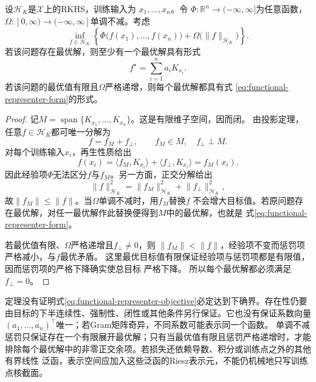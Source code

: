 \begin{theorem}[有限样本表示定理]
\label{thm:functional-representer-theorem}
设$\mathcal{H}_K$是$\mathcal{X}$上的RKHS，训练输入为
$x_1,\ldots,x_n$。令
$\Phi:\mathbb{R}^n\to(-\infty,\infty]$为任意函数，
$\Omega:[0,\infty)\to(-\infty,\infty]$单调不减。考虑
\begin{equation}
  \inf_{f\in\mathcal{H}_K}
  \left\{
    \Phi\bigl(f(x_1),\ldots,f(x_n)\bigr)
    +
    \Omega\bigl(\lVert f\rVert_{\mathcal{H}_K}\bigr)
  \right\}.
  \label{eq:functional-representer-objective}
\end{equation}
若该问题存在最优解，则至少有一个最优解具有形式
\begin{equation}
  f^\star
  =
  \sum_{i=1}^{n}a_iK_{x_i}.
  \label{eq:functional-representer-form}
\end{equation}
若该问题的最优值有限且$\Omega$严格递增，则每个最优解都具有式
\eqref{eq:functional-representer-form}的形式。
\end{theorem}

\begin{proof}
记$M=\operatorname{span}\{K_{x_1},\ldots,K_{x_n}\}$。这是有限维子空间，因而闭。
由投影定理，任意$f\in\mathcal{H}_K$都可唯一分解为
\[
  f=f_M+f_{\perp},\qquad f_M\in M,\quad f_{\perp}\perp M.
\]
对每个训练输入$x_i$，再生性质给出
\[
  f(x_i)
  =
  \langle f_M,K_{x_i}\rangle
  +
  \langle f_{\perp},K_{x_i}\rangle
  =
  f_M(x_i).
\]
因此经验项$\Phi$无法区分$f$与$f_M$。另一方面，正交分解给出
\[
  \lVert f\rVert_{\mathcal{H}_K}^2
  =
  \lVert f_M\rVert_{\mathcal{H}_K}^2
  +
  \lVert f_{\perp}\rVert_{\mathcal{H}_K}^2,
\]
故$\lVert f_M\rVert\leq\lVert f\rVert$。当$\Omega$单调不减时，用$f_M$替换$f$
不会增大目标值。若原问题存在最优解，对任一最优解作此替换便得到$M$中的最优解，也就是
式\eqref{eq:functional-representer-form}。

若最优值有限、$\Omega$严格递增且$f_{\perp}\neq0$，则
$\lVert f_M\rVert<\lVert f\rVert$，经验项不变而惩罚项严格减小，与$f$最优矛盾。
这里最优目标值有限保证经验项与惩罚项都是有限值，因而惩罚项的严格下降确实使总目标
严格下降。
所以每个最优解都必须满足$f_{\perp}=0$。
\end{proof}

定理没有证明式\eqref{eq:functional-representer-objective}必定达到下确界。存在性仍要
由目标的下半连续性、强制性、闭性或其他条件另行保证。它也没有保证系数向量
$(a_1,\ldots,a_n)^{\top}$唯一；若Gram矩阵奇异，不同系数可能表示同一个函数。
单调不减惩罚只保证存在一个有限展开最优解；只有当最优值有限且惩罚严格递增时，才能
排除每个最优解中的非零正交余项。若损失还依赖导数、积分或训练点之外的其他有界线性
泛函，表示空间应加入这些泛函的Riesz表示元，不能仍机械地只写训练点核截面。

